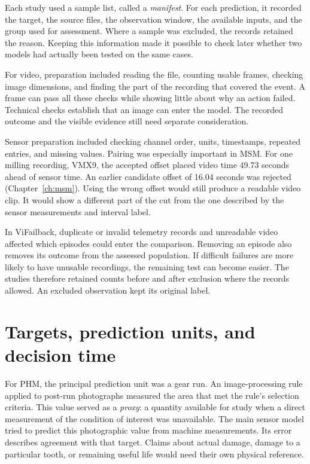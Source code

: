 Each study used a sample list, called a \emph{manifest}. For each prediction, it recorded the target, the source files, the observation window, the available inputs, and the group used for assessment. Where a sample was excluded, the records retained the reason. Keeping this information made it possible to check later whether two models had actually been tested on the same cases.

For video, preparation included reading the file, counting usable frames, checking image dimensions, and finding the part of the recording that covered the event. A frame can pass all these checks while showing little about why an action failed. Technical checks establish that an image can enter the model. The recorded outcome and the visible evidence still need separate consideration.

Sensor preparation included checking channel order, units, timestamps, repeated entries, and missing values. Pairing was especially important in MSM. For one milling recording, VMX9, the accepted offset placed video time 49.73 seconds ahead of sensor time. An earlier candidate offset of 16.04 seconds was rejected (Chapter~\ref{ch:msm}). Using the wrong offset would still produce a readable video clip. It would show a different part of the cut from the one described by the sensor measurements and interval label.

In ViFailback, duplicate or invalid telemetry records and unreadable video affected which episodes could enter the comparison. Removing an episode also removes its outcome from the assessed population. If difficult failures are more likely to have unusable recordings, the remaining test can become easier. The studies therefore retained counts before and after exclusion where the records allowed. An excluded observation kept its original label.

\section{Targets, prediction units, and decision time}
\label{sec:ch4-targets}

For PHM, the principal prediction unit was a gear run. An image-processing rule applied to post-run photographs measured the area that met the rule’s selection criteria. This value served as a \emph{proxy}: a quantity available for study when a direct measurement of the condition of interest was unavailable. The main sensor model tried to predict this photographic value from machine measurements. Its error describes agreement with that target. Claims about actual damage, damage to a particular tooth, or remaining useful life would need their own physical reference.

